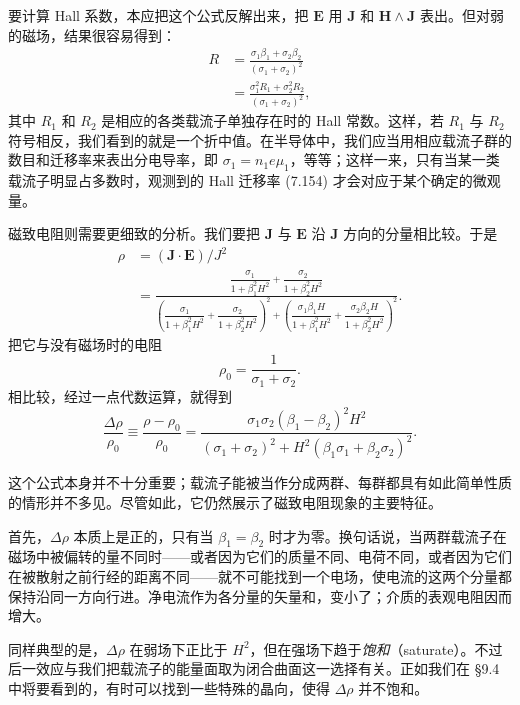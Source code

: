 要计算 Hall 系数，本应把这个公式反解出来，把 $\mathbf{E}$ 用 $\mathbf{J}$ 和 $\mathbf{H}\wedge\mathbf{J}$ 表出。但对弱的磁场，结果很容易得到：
\begin{align*}
R&=\frac{\sigma_{1}\beta_{1}+\sigma_{2}\beta_{2}}{(\sigma_{1}+\sigma_{2})^{2}}\\
&=\frac{\sigma_{1}^{2}R_{1}+\sigma_{2}^{2}R_{2}}{(\sigma_{1}+\sigma_{2})^{2}},\tag{7.160}
\end{align*}
其中 $R_{1}$ 和 $R_{2}$ 是相应的各类载流子单独存在时的 Hall 常数。这样，若 $R_{1}$ 与 $R_{2}$ 符号相反，我们看到的就是一个折中值。在半导体中，我们应当用相应载流子群的数目和迁移率来表出分电导率，即 $\sigma_{1}=n_{1}e\mu_{1}$，等等；这样一来，只有当某一类载流子明显占多数时，观测到的 Hall 迁移率 (7.154) 才会对应于某个确定的微观量。

磁致电阻则需要更细致的分析。我们要把 $\mathbf{J}$ 与 $\mathbf{E}$ 沿 $\mathbf{J}$ 方向的分量相比较。于是
\begin{align*}
\rho&=(\mathbf{J}\cdot\mathbf{E})/J^{2}\\
&=\frac{\dfrac{\sigma_{1}}{1+\beta_{1}^{2}H^{2}}+\dfrac{\sigma_{2}}{1+\beta_{2}^{2}H^{2}}}{\left(\dfrac{\sigma_{1}}{1+\beta_{1}^{2}H^{2}}+\dfrac{\sigma_{2}}{1+\beta_{2}^{2}H^{2}}\right)^{2}+\left(\dfrac{\sigma_{1}\beta_{1}H}{1+\beta_{1}^{2}H^{2}}+\dfrac{\sigma_{2}\beta_{2}H}{1+\beta_{2}^{2}H^{2}}\right)^{2}}.\tag{7.161}
\end{align*}
把它与没有磁场时的电阻
\begin{equation*}
\rho_{0}=\frac{1}{\sigma_{1}+\sigma_{2}}.\tag{7.162}
\end{equation*}
相比较，经过一点代数运算，就得到
\begin{equation*}
\frac{\Delta\rho}{\rho_{0}}\equiv\frac{\rho-\rho_{0}}{\rho_{0}}=\frac{\sigma_{1}\sigma_{2}(\beta_{1}-\beta_{2})^{2}H^{2}}{(\sigma_{1}+\sigma_{2})^{2}+H^{2}(\beta_{1}\sigma_{1}+\beta_{2}\sigma_{2})^{2}}.\tag{7.163}
\end{equation*}

这个公式本身并不十分重要；载流子能被当作分成两群、每群都具有如此简单性质的情形并不多见。尽管如此，它仍然展示了磁致电阻现象的主要特征。

首先，$\Delta\rho$ 本质上是正的，只有当 $\beta_{1}=\beta_{2}$ 时才为零。换句话说，当两群载流子在磁场中被偏转的量不同时——或者因为它们的质量不同、电荷不同，或者因为它们在被散射之前行经的距离不同——就不可能找到一个电场，使电流的这两个分量都保持沿同一方向行进。净电流作为各分量的矢量和，变小了；介质的表观电阻因而增大。

同样典型的是，$\Delta\rho$ 在弱场下正比于 $H^{2}$，但在强场下趋于\emph{饱和}（saturate）。不过后一效应与我们把载流子的能量面取为闭合曲面这一选择有关。正如我们在 §9.4 中将要看到的，有时可以找到一些特殊的晶向，使得 $\Delta\rho$ 并不饱和。

